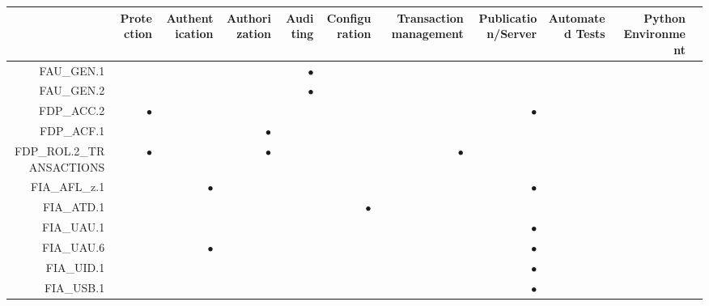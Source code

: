\documentclass[12pt,english]{scrbook}
\newcommand{\oh}{$\bullet$}
\begin{document}
\begin{longtable}{rRRRRRRRRRR}
        \toprule
                    & Protection & Authentication & Authorization & Auditing & Configuration & Transaction management & Publication/Server & Automated Tests & Python Environment \\
        \midrule\endhead
FAU\_GEN.1          &            &                &               & \oh      &               &                        &                    &                 &                    \\   
FAU\_GEN.2          &            &                &               & \oh      &               &                        &                    &                 &                    \\   
FDP\_ACC.2          & \oh        &                &               &          &               &                        & \oh                &                 &                    \\   
FDP\_ACF.1          &            &                &  \oh          &          &               &                        &                    &                 &                    \\   
FDP\_ROL.2\_TRANSACTIONS
                    & \oh        &                &  \oh          &          &               & \oh                    &                    &                 &                    \\   
FIA\_AFL\_z.1       &            &  \oh           &               &          &               &                        & \oh                &                 &                    \\   
FIA\_ATD.1          &            &                &               &          & \oh           &                        &                    &                 &                    \\   
FIA\_UAU.1          &            &                &               &          &               &                        & \oh                &                 &                    \\   
FIA\_UAU.6          &            &  \oh           &               &          &               &                        & \oh                &                 &                    \\   
FIA\_UID.1          &            &                &               &          &               &                        & \oh                &                 &                    \\   
FIA\_USB.1          &            &                &               &          &               &                        &  \oh               &                 &                    \\   

\end{longtable}
\end{document}
